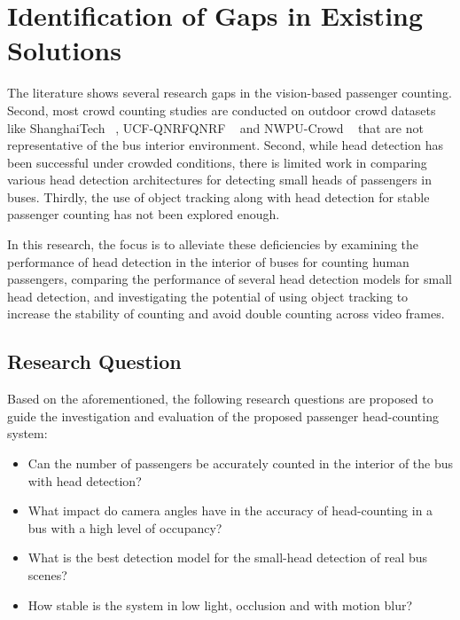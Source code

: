\section{Identification of Gaps in Existing Solutions}

The literature shows several research gaps in the vision-based passenger counting. Second, most crowd counting studies are conducted on outdoor crowd datasets like ShanghaiTech ~\cite{Zhu2020}, UCF-QNRFQNRF ~\cite{ucf_qnrf_dataset} and NWPU-Crowd ~\cite{wang2020nwpu} that are not representative of the bus interior environment. Second, while head detection has been successful under crowded conditions, there is limited work in comparing various head detection architectures for detecting small heads of passengers in buses. Thirdly, the use of object tracking along with head detection for stable passenger counting has not been explored enough.

In this research, the focus is to alleviate these deficiencies by examining the performance of head detection in the interior of buses for counting human passengers, comparing the performance of several head detection models for small head detection, and investigating the potential of using object tracking to increase the stability of counting and avoid double counting across video frames.

\subsection{Research Question}

Based on the aforementioned, the following research questions are proposed to guide the investigation and evaluation of the proposed passenger head-counting system:

\begin{itemize}
    \item Can the number of passengers be accurately counted in the interior of the bus with head detection?
    \item What impact do camera angles have in the accuracy of head-counting in a bus with a high level of occupancy?
    \item What is the best detection model for the small-head detection of real bus scenes?
    \item How stable is the system in low light, occlusion and with motion blur?
\end{itemize}
